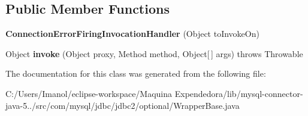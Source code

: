 \subsection*{Public Member Functions}
\begin{DoxyCompactItemize}
\item 
\mbox{\label{classcom_1_1mysql_1_1jdbc_1_1jdbc2_1_1optional_1_1_wrapper_base_1_1_connection_error_firing_invocation_handler_abebb0ab4a560298d817ceb144c690f43}} 
{\bfseries Connection\+Error\+Firing\+Invocation\+Handler} (Object to\+Invoke\+On)
\item 
\mbox{\label{classcom_1_1mysql_1_1jdbc_1_1jdbc2_1_1optional_1_1_wrapper_base_1_1_connection_error_firing_invocation_handler_a1e56d38d05e41eb4ccd98fdf95f91f82}} 
Object {\bfseries invoke} (Object proxy, Method method, Object\mbox{[}$\,$\mbox{]} args)  throws Throwable 
\end{DoxyCompactItemize}


The documentation for this class was generated from the following file\+:\begin{DoxyCompactItemize}
\item 
C\+:/\+Users/\+Imanol/eclipse-\/workspace/\+Maquina Expendedora/lib/mysql-\/connector-\/java-\/5../src/com/mysql/jdbc/jdbc2/optional/Wrapper\+Base.\+java\end{DoxyCompactItemize}
